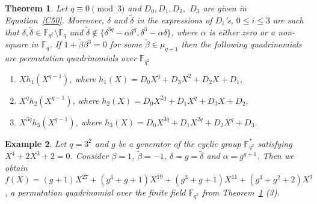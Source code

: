 \documentclass[12pt]{amsart}
\newtheorem{thm}{Theorem}[section]
\newtheorem{exmp}[thm]{Example}
\numberwithin{equation}{section}
\theoremstyle{definition}
\newcommand{\F}{\mathbb F}
\begin{document}
\begin{thm}\label{T51}
  Let $q\equiv 0 \pmod 3$ and $D_0, D_1, D_2,$ $D_3$ are given in Equation~\eqref{C50}. Moreover, $\delta$ and $\tilde \delta$ in the expressions of $D_i$'s, $0 \leq i \leq 3$ are such that $\delta, \tilde \delta \in \F_{q^2}\setminus\F_{q}$ and $\tilde \delta \not \in \{ \delta^{3q}-\alpha \delta^q, \delta^3-\alpha \delta\}$, where $\alpha$ is either zero or a non-square in $\F_q$. If $1+{\tilde \beta}\beta^3=0$ for some ${\tilde \beta}\in \mu_{q+1}$ then the following quadrinomials are permutation quadrinomials over $\F_{q^2}$
 \begin{enumerate}
 \item $Xh_1(X^{q-1})$, where $h_1(X)= D_0X^q+D_3X^2 +D_2X+D_1$,
 \item  $X^{q}h_2(X^{q-1})$, where $h_2(X)=D_0X^{2q}+D_1X^q+D_3X+D_2$,
 \item  $X^{3q}h_3(X^{q-1})$, where $h_3(X)=D_0X^{3q}+D_1X^{2q}+D_2X^q+D_3$.
 \end{enumerate}
\end{thm}
 \begin{exmp}
 Let $q=3^2$ and $g$ be a generator of the cyclic group $\F_{q^2}^{*}$ satisfying $X^4 + 2X^3 + 2=0$. Consider $\beta=1$, $\tilde{\beta}=-1$, $\delta=g=\tilde{\delta}$ and $\alpha=g^{q+1}$. Then we obtain $f(X)=(g+1)X^{27}+(g^3+g+1)X^{19}+(g^3+g+1)X^{11}+(g^3+g^2+2)X^3$, a permutation quadrinomial over the finite field $\F_{q^2}$ from Theorem~\ref{T51} (3).
\end{exmp}
\end{document}
